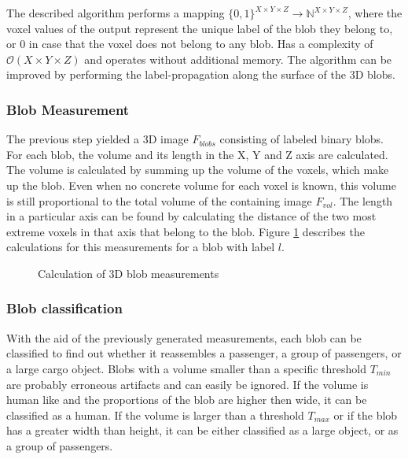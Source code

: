 The described algorithm performs a mapping $ \{0, 1\}^{X \times Y \times Z} \rightarrow \mathbb{N}^{X \times Y \times Z} $, where the voxel values of the output represent the unique label of the blob they belong to, or 0 in case that the voxel does not belong to any blob.
Has a complexity of $ \mathcal{O}(X \times Y \times Z) $ and operates without additional memory. 
The algorithm can be improved by performing the label-propagation along the surface of the \ac{3D} blobs.

\subsubsection{Blob Measurement}

The previous step yielded a \ac{3D} image $ F_{blobs} $ consisting of labeled binary blobs.
For each blob, the volume and its length in the X, Y and Z axis are calculated.
The volume is calculated by summing up the volume of the voxels, which make up the blob.
Even when no concrete volume for each voxel is known, this volume is still proportional to the total volume of the containing image $ F_{vol} $.
The length in a particular axis can be found  by calculating the distance of the two most extreme voxels in that axis that belong to the blob.
Figure \ref{fig:design:blobmeasurement} describes the calculations for this measurements for a blob with label $ l $.

\begin{figure}[h!]
\caption{Calculation of 3D blob measurements}
\label{fig:design:blobmeasurement}
\end{figure}

\newpage

\subsubsection{Blob classification}
With the aid of the previously generated measurements, each blob can be classified to find out whether it reassembles a passenger, a group of passengers, or a large cargo object.
Blobs with a volume smaller than a specific threshold $ T_{min} $ are probably erroneous artifacts and can easily be ignored.
If the volume is human like and the proportions of the blob are higher then wide, it can be classified as a human. 
If the volume is larger than a threshold $ T_{max} $ or if the blob has a greater width than height, it can be either classified as a large object, or as a group of passengers.

